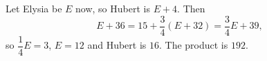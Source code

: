 Let Elysia be $E$ now, so Hubert is $E+4$. Then
\[E+36=15+\dfrac34(E+32)=\dfrac34E+39,\]
so $\dfrac14E=3$, $E=12$ and Hubert is $16$. The product is $\boxed{192}$.
